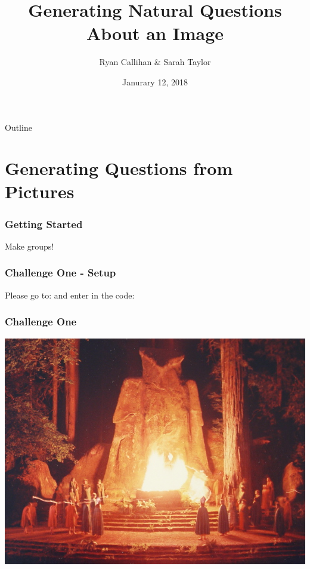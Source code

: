 \documentclass[xcolor=dvipsnames]{beamer}
\title{Generating Natural Questions About an Image}
\subtitle{\cite{mostafazadeh-EtAl:2016:P16-1}}
\author{Ryan Callihan \& Sarah Taylor}
\institute[Universit{\"a}t T{\"u}bingen] %
{
	Seminar f{\"u}r Sprachwissenschaft\\
	Universit{\"a}t T{\"u}bingen
}
\date{Janurary 12, 2018}
\begin{document}
	
	\begin{frame}
		\titlepage
	\end{frame}
	
	\begin{frame}{Outline}
		\tableofcontents
	\end{frame}
	
	\section{Generating Questions from Pictures}
	
		\begin{frame}
			\frametitle{Getting Started}
			Make groups!
		\end{frame}
	
		\begin{frame}
			\frametitle{Challenge One - Setup}
			Please go to: and enter in the code:
		\end{frame}
		
		
		\begin{frame}
			\frametitle{Challenge One}
			\includegraphics[width=\textwidth]{images/cremation_of_care.jpg}
		\end{frame}
	
\end{document}
